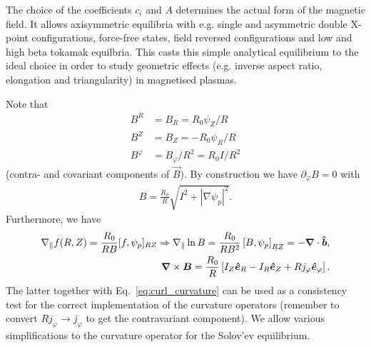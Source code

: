 The choice of the coefficients \(c_{i}\) and \(A\) determines the actual form of the magnetic field. It allows axisymmetric equilibria with e.g. single and asymmetric double X-point configurations, force-free states,
field reversed configurations and low and high beta tokamak equilbria. This casts this simple analytical equilibrium to the ideal choice in order to study geometric effects (e.g. inverse aspect ratio, elongation and triangularity) in magnetised plasmas.

Note that
\begin{align}
    B^R&=B_R = R_0\psi_Z/R \\
    B^Z&=B_Z = - R_0\psi_R/R \\
    B^\varphi &= B_\varphi/R^2 = R_0I/R^2
\end{align}
(contra- and covariant components of $\vec B$).
By construction we have $\partial_\varphi B = 0$ with
\begin{align}
  B = \frac{R_0}{R}\sqrt{ {I^2 + |\nabla \psi_p|^2}}.
    \label{}
\end{align}
Furthermore, we have
\begin{align}
  \nabla_\parallel f(R,Z) = \frac{R_0}{RB}[f,\psi_p]_{RZ}\Rightarrow \nabla_\parallel \ln B = \frac{R_0}{RB^2}\left[B, \psi_p\right]_{RZ} = -{\boldsymbol{\nabla}}\cdot\bm{\hat{b}},\\
    {\boldsymbol{\nabla}}\times {\boldsymbol{B}} = \frac{R_0}{R}\left[ I_Z \bm{\hat{e}}_R - I_R\bm{\hat{e}}_Z + Rj_\varphi\bm{\hat{e}}_\varphi  \right].
    \label{}
\end{align}
The latter together with Eq.~\eqref{eq:curl_curvature}
can be used as a consistency test for the correct implementation of the
curvature operators (remember to convert $Rj_\varphi \rightarrow j_\varphi$ to get the contravariant component).
We allow various simplifications to the curvature operator
for the Solov'ev equilibrium.


